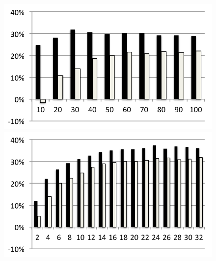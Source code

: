 \begin{figure}
  \includegraphics[width=\mywidth]{../../eval/32threads/case3it.pdf}\includegraphics[width=\mywidth]{../../eval/32threads/case3th.pdf}
\end{figure}
\vspace{-1cm}
